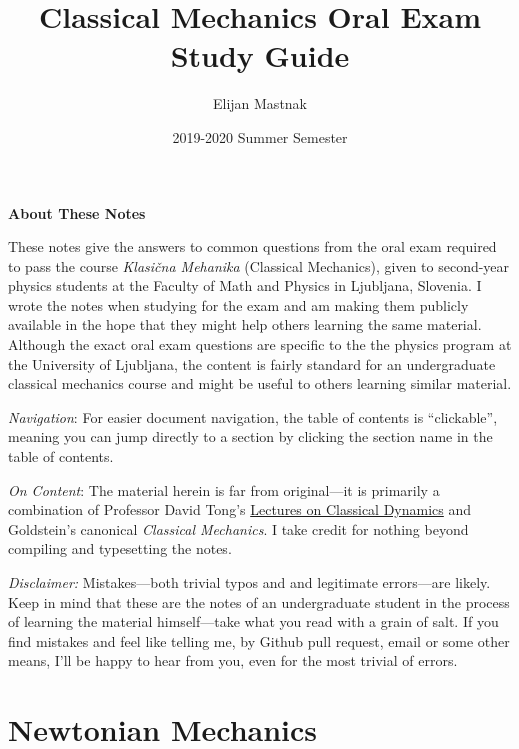 \documentclass[11pt, a4paper]{article}
\begin{document}
\title{Classical Mechanics Oral Exam Study Guide}
\author{Elijan Mastnak}
\date{2019-2020 Summer Semester}
\maketitle

\begin{center}
\textbf{About These Notes}
\end{center}
These notes give the answers to common questions from the oral exam required to pass the course \textit{Klasi\v{c}na Mehanika} (Classical Mechanics), given to second-year physics students at the Faculty of Math and Physics in Ljubljana, Slovenia. I wrote the notes when studying for the exam and am making them publicly available in the hope that they might help others learning the same material. Although the exact oral exam questions are specific to the the physics program at the University of Ljubljana, the content is fairly standard for an undergraduate classical mechanics course and might be useful to others learning similar material.

\vspace{2mm}
\textit{Navigation}: For easier document navigation, the table of contents is ``clickable'', meaning you can jump directly to a section by clicking the section name in the table of contents.

\vspace{2mm}
\textit{On Content}: The material herein is far from original---it is primarily a combination of Professor David Tong's \href{http://www.damtp.cam.ac.uk/user/tong/dynamics.html}{Lectures on Classical Dynamics} and Goldstein's canonical \textit{Classical Mechanics}. I take credit for nothing beyond compiling and typesetting the notes.

\vspace{2mm}
\textit{Disclaimer:} Mistakes---both trivial typos and  and legitimate errors---are likely. Keep in mind that these are the notes of an undergraduate student in the process of learning the material himself---take what you read with a grain of salt. If you find mistakes and feel like telling me, by Github pull request, email or some other means, I'll be happy to hear from you, even for the most trivial of errors.



\tableofcontents

\newpage

\section{Newtonian Mechanics}
\end{document}
